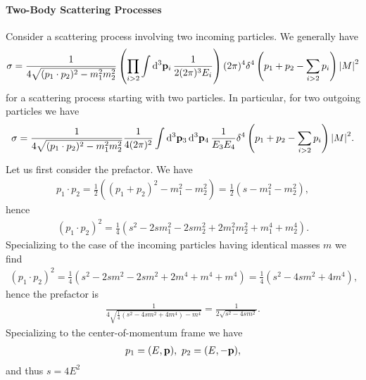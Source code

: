 \paragraph{Two-Body Scattering Processes}
Consider a scattering process involving two incoming particles. We generally have
\begin{align*}
	\sigma = \frac{1}{4\sqrt{(p_{1}\cdot p_{2})^{2} - m_{1}^{2}m_{2}^{2}}}\left(\prod\limits_{i > 2}\int\limits_{}^{}\dd[3]{\vb{p}_{i}}\frac{1}{2(2\pi)^{3}E_{i}}\right)(2\pi)^{4}\delta^{4}\left(p_{1} + p_{2} - \sum\limits_{i > 2}p_{i}\right)\abs{M}^{2}
\end{align*}
for a scattering process starting with two particles. In particular, for two outgoing particles we have
\begin{align*}
	\sigma = \frac{1}{4\sqrt{(p_{1}\cdot p_{2})^{2} - m_{1}^{2}m_{2}^{2}}}\frac{1}{4(2\pi)^{2}}\int\limits_{}^{}\dd[3]{\vb{p}_{3}}\dd[3]{\vb{p}_{4}}\frac{1}{E_{3}E_{4}}\delta^{4}\left(p_{1} + p_{2} - \sum\limits_{i > 2}p_{i}\right)\abs{M}^{2}.
\end{align*}
Let us first consider the prefactor. We have
\begin{align*}
	p_{1}\cdot p_{2} = \frac{1}{2}((p_{1} +  p_{2})^{2} - m_{1}^{2} - m_{2}^{2}) = \frac{1}{2}(s - m_{1}^{2} - m_{2}^{2}),
\end{align*}
hence
\begin{align*}
	(p_{1}\cdot p_{2})^{2} = \frac{1}{4}(s^{2} - 2sm_{1}^{2} - 2sm_{2}^{2} + 2m_{1}^{2}m_{2}^{2} + m_{1}^{4} + m_{2}^{4}).
\end{align*}
Specializing to the case of the incoming particles having identical masses $m$ we find
\begin{align*}
	(p_{1}\cdot p_{2})^{2} = \frac{1}{4}(s^{2} - 2sm^{2} - 2sm^{2} + 2m^{4} + m^{4} + m^{4}) = \frac{1}{4}(s^{2} - 4sm^{2} + 4m^{4}),
\end{align*}
hence the prefactor is
\begin{align*}
	\frac{1}{4\sqrt{\frac{1}{4}(s^{2} - 4sm^{2} + 4m^{4}) - m^{4}}} = \frac{1}{2\sqrt{s^{2} - 4sm^{2}}}.
\end{align*}
Specializing to the center-of-momentum frame we have
\begin{align*}
	p_{1} = (E, \vb{p}),\ p_{2} = (E, -\vb{p}),
\end{align*}
and thus $s = 4E^{2}$


